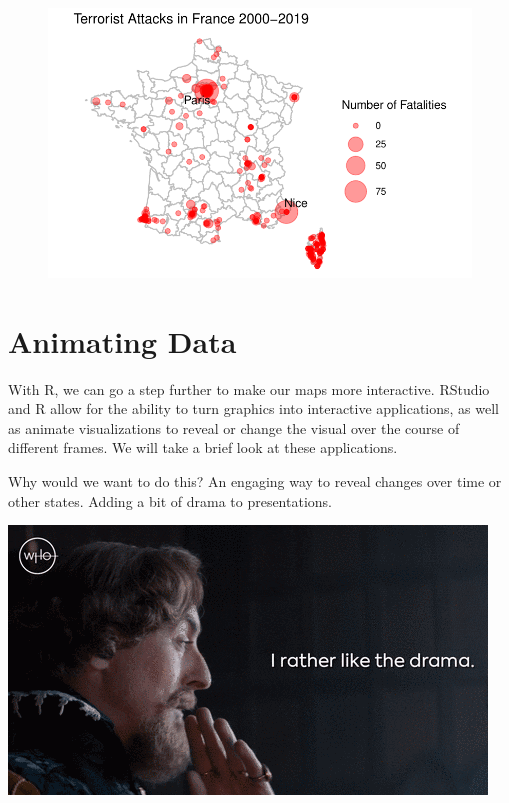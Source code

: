 \documentclass[
  letterpaper,
  DIV=11,
  numbers=noendperiod]{scrreprt}
\begin{document}
\begin{figure}[H]

{\centering \includegraphics{12-Maps_files/figure-pdf/unnamed-chunk-27-1.pdf}

}

\end{figure}

\hypertarget{animating-data}{%
\section{Animating Data}\label{animating-data}}

With R, we can go a step further to make our maps more interactive.
RStudio and R allow for the ability to turn graphics into interactive
applications, as well as animate visualizations to reveal or change the
visual over the course of different frames. We will take a brief look at
these applications.

Why would we want to do this? An engaging way to reveal changes over
time or other states. Adding a bit of drama to presentations.

\includegraphics{images/giphy.gif}
\end{document}
